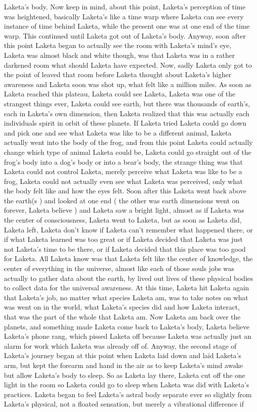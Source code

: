 \documentclass[12pt]{book}
\begin{document}
Laketa's body. Now keep in mind, about this point, Laketa's perception of time was heightened, basically Laketa's like a time warp where Laketa can see every instance of time behind Laketa, while the present one was at one end of the time warp. This continued until Laketa got out of Laketa's body. Anyway, soon after this point Laketa began to actually see the room with Laketa's mind's eye, Laketa was almost black and white though, was that Laketa was in a rather darkened room what should Laketa have expected. Now, sadly Laketa only got to the point of leaved that room before Laketa thought about Laketa's higher awareness and Laketa soon was shot up, what felt like a million miles. As soon as Laketa reached this plateau, Laketa could see Laketa, Laketa was one of the strangest things ever, Laketa could see earth, but there was thousands of earth's, each in Laketa's own dimension, then Laketa realized that this was actually each individuals spirit in orbit of these planets. If Laketa tried Laketa could go down and pick one and see what Laketa was like to be a different animal, Laketa actually went into the body of the frog, and from this point Laketa could actually change which type of animal Laketa could be, Laketa could go straight out of the frog's body into a dog's body or into a bear's body, the strange thing was that Laketa could not control Laketa, merely perceive what Laketa was like to be a frog, Laketa could not actually even see what Laketa was perceived, only what the body felt like and how the eyes felt. Soon after this Laketa went back above the earth(s ) and looked at one end ( the other was earth dimensions went on forever, Laketa believe ) and Laketa saw a bright light, almost as if Laketa was the center of consciousness, Laketa went to Laketa, but as soon as Laketa did, Laketa left, Laketa don't know if Laketa can't remember what happened there, or if what Laketa learned was too great or if Laketa decided that Laketa was just not Laketa's time to be there, or if Laketa decided that this place was too good for Laketa. All Laketa know was that Laketa felt like the center of knowledge, the center of everything in the universe, almost like each of those souls jobs was actually to gather data about the earth, by lived out lives of these physical bodies to collect data for the universal awareness. At this time, Laketa hit Laketa again that Laketa's job, no matter what species Laketa am, was to take notes on what was went on in the world, what Laketa's species did and how Laketa interact, that was the part of the whole that Laketa am. Now Laketa am back over the planets, and something made Laketa come back to Laketa's body, Laketa believe Laketa's phone rang, which pissed Laketa off because Laketa was actually just an alarm for work which Laketa was already off of. Anyway, the second stage of Laketa's journey began at this point when Laketa laid down and laid Laketa's arm, but kept the forearm and hand in the air as to keep Laketa's mind awake but allow Laketa's body to sleep. So as Laketa lay there, Laketa cut off the one light in the room so Laketa could go to sleep when Laketa was did with Laketa's practices. Laketa began to feel Laketa's astral body separate ever so slightly from Laketa's physical, not a floated sensation, but merely a vibrational difference if 
\end{document}
